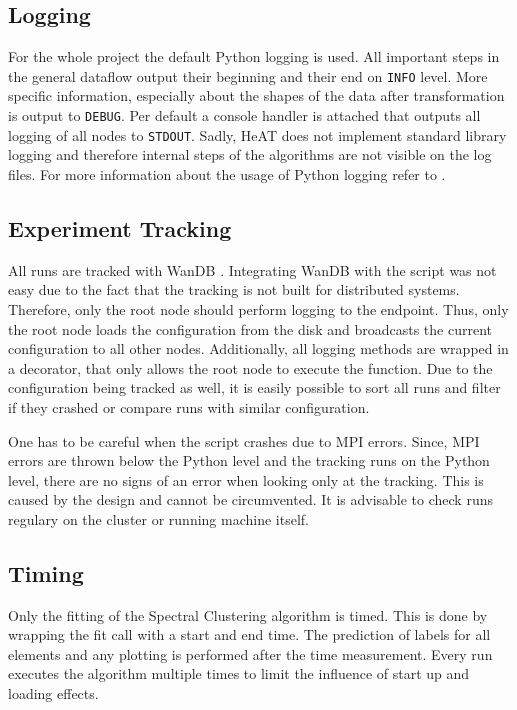 \subsection{Logging}
\label{subsec:logging}
For the whole project the default Python logging \cite{noauthor_pep_nodate} is used.
All important steps in the general dataflow output their beginning and their end on \lstinline{INFO} level.
More specific information, especially about the shapes of the data after transformation is output to \lstinline{DEBUG}.
Per default a console handler is attached that outputs all logging of all nodes to \lstinline{STDOUT}.
Sadly, \gls{HeAT} does not implement standard library logging and therefore internal steps of the algorithms are not visible on the log files.
For more information about the usage of Python logging refer to \cite{noauthor_pep_nodate}.


\subsection{Experiment Tracking}
\label{subsec:experiment_tracking}
All runs are tracked with WanDB \cite{noauthor_weights_nodate}. Integrating WanDB with the script was not easy due
to the fact that the tracking is not built for distributed systems. Therefore, only the root node should perform
logging to the endpoint.
Thus, only the root node loads the configuration from the disk and broadcasts the current configuration
to all other nodes.
Additionally, all logging methods are wrapped in a decorator, that only allows the root node to execute the function.
Due to the configuration being tracked as well, it is easily possible to sort all runs and filter if they crashed or
compare runs with similar configuration.

One has to be careful when the script crashes due to \gls{MPI} errors. Since, \gls{MPI} errors are thrown
below the Python level and the tracking runs on the Python level, there are no signs of an error when looking only at
the tracking. This is caused by the design and cannot be circumvented. It is advisable to check runs regulary on
the cluster or running machine itself.

\subsection{Timing}
\label{subsec:timing}
Only the fitting of the Spectral Clustering algorithm is timed. This is done by wrapping the fit call with a start
and end time. The prediction of labels for all elements and any plotting is performed after the time measurement.
Every run executes the algorithm multiple times to limit the influence of start up and loading effects.
